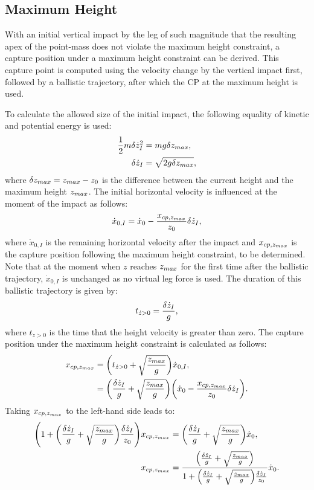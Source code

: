 \subsection{Maximum Height}
With an initial vertical impact by the leg of such magnitude that the resulting apex of the point-mass does not violate the maximum height constraint, a capture position under a maximum height constraint can be derived. This capture point is computed using the velocity change by the vertical impact first, followed by a ballistic trajectory, after which the \ac{CP} at the maximum height is used.

To calculate the allowed size of the initial impact, the following equality of kinetic and potential energy is used:
\begin{align}
 	\frac{1}{2}m\delta \dot{z}_I^2 &= mg\delta z_{max},\\
 	\delta \dot{z}_I &= \sqrt{2g\delta z_{max}}, 
\end{align}
where $\delta z_{max}=z_{max}-z_0$ is the difference between the current height and the maximum height $z_{max}$. The initial horizontal velocity is influenced at the moment of the impact as follows:
\begin{equation}\label{eq:dotximpact}
	\dot{x}_{0,I} = \dot{x}_0-\frac{x_{cp,z_{max}}}{z_0}\delta \dot{z}_I,
\end{equation}
where $\dot{x}_{0,I}$ is the remaining horizontal velocity after the impact and $x_{cp,z_{max}}$ is the capture position following the maximum height constraint, to be determined. Note that at the moment when $z$ reaches $z_{max}$ for the first time after the ballistic trajectory, $\dot{x}_{0,I}$ is unchanged as no virtual leg force is used. The duration of this ballistic trajectory is given by:
\begin{equation}
	t_{\dot{z}>0} =\frac{\delta \dot{z}_I}{g},
\end{equation}
where $t_{\dot{z}>0}$ is the time that the height velocity is greater than zero. The capture position under the maximum height constraint is calculated as follows:
\begin{align}
	x_{cp,z_{max}}&=\bigg(t_{\dot{z}>0}+\sqrt{\frac{z_{max}}{g}}\bigg)\dot{x}_{0,I},\\
			&=\bigg(\frac{\delta \dot{z}_I}{g}+\sqrt{\frac{z_{max}}{g}}\bigg)\bigg(\dot{x}_0-\frac{x_{cp,z_{max}}}{z_0}\delta \dot{z}_I\bigg).
\end{align}
Taking $x_{cp,z_{max}}$ to the left-hand side leads to:
\begin{align}
	 \Bigg(1+\bigg(\frac{\delta \dot{z}_I}{g}+\sqrt{\frac{z_{max}}{g}}\bigg)\frac{\delta \dot{z}_I}{z_0}\Bigg)x_{cp,z_{max}}& =		\bigg(\frac{\delta \dot{z}_I}{g}+\sqrt{\frac{z_{max}}{g}}\bigg)\dot{x}_0,\\
	 x_{cp,z_{max}} & = \frac{\Big(\frac{\delta \dot{z}_I}{g}+\sqrt{\frac{z_{max}}{g}}\Big)}{ 1+\Big(\frac{\delta \dot{z}_I}{g}+\sqrt{\frac{z_{max}}{g}}\Big)\frac{\delta \dot{z}_I}{z_0}}\dot{x}_0.
\end{align}
